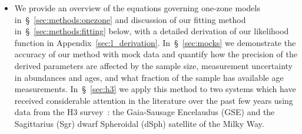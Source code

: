 \documentclass[ms.tex]{subfiles}
\begin{document}
\begin{itemize}
	\item We provide an overview of the equations governing one-zone models
	in~\S~\ref{sec:methods:onezone} and discussion of our fitting method
	in~\S~\ref{sec:methods:fitting} below, with a detailed derivation of our
	likelihood function in Appendix~\ref{sec:l_derivation}.
	In~\S~\ref{sec:mocks} we demonstrate the accuracy of our method with mock
	data and quantify how the precision of the derived parameters are affected
	by the sample size, measurement uncertainty in abundances and ages, and
	what fraction of the sample has available age measurements.
	In~\S~\ref{sec:h3} we apply this method to two systems which have received
	considerable attention in the literature over the past few years using data
	from the H3 survey~\citep{Conroy2019}: the Gaia-Sausage Encelaudus (GSE)
	and the Sagittarius (Sgr) dwarf Spheroidal (dSph) satellite of the Milky
	Way.

\end{itemize}
\end{document}
